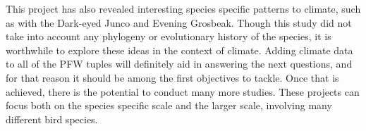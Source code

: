This project has also revealed interesting species specific patterns to climate, such as with the Dark-eyed Junco and Evening Grosbeak. Though this study did not take into account any phylogeny or evolutionary history of the species, it is worthwhile to explore these ideas in the context of climate. Adding climate data to all of the PFW tuples will definitely aid in answering the next questions, and for that reason it should be among the first objectives to tackle. Once that is achieved, there is the potential to conduct many more studies. These projects can focus both on the species specific scale and the larger scale, involving many different bird species.       


